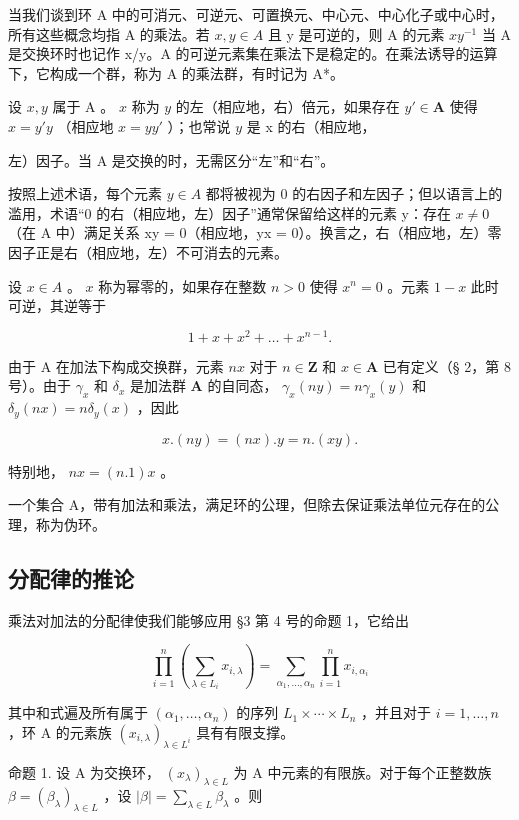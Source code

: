 当我们谈到环 A 中的可消元、可逆元、可置换元、中心元、中心化子或中心时，所有这些概念均指 A 的乘法。若 \(x, y \in A\) 且 y 是可逆的，则 A 的元素 \(xy^{-1}\) 当 A 是交换环时也记作 x/y。A 的可逆元素集在乘法下是稳定的。在乘法诱导的运算下，它构成一个群，称为 A 的乘法群，有时记为 A*。

设 \(x, y\) 属于 A 。 \(x\) 称为 \(y\) 的左（相应地，右）倍元，如果存在 \(y' \in \mathbf{A}\) 使得 \(x = y'y\) （相应地 \(x = yy'\) ）；也常说 \(y\) 是 x 的右（相应地，

左）因子。当 A 是交换的时，无需区分“左”和“右”。

按照上述术语，每个元素 \(y \in A\) 都将被视为 0 的右因子和左因子；但以语言上的滥用，术语“0 的右（相应地，左）因子”通常保留给这样的元素 y：存在 \(x \neq 0\) （在 A 中）满足关系 xy = 0（相应地，yx = 0）。换言之，右（相应地，左）零因子正是右（相应地，左）不可消去的元素。

设 \(x \in A\) 。 \(x\) 称为幂零的，如果存在整数 \(n > 0\) 使得 \(x^n = 0\) 。元素 \(1 - x\) 此时可逆，其逆等于

\[
1 + x + x ^ {2} + \dots + x ^ {n - 1}.
\]

由于 A 在加法下构成交换群，元素 \(nx\) 对于 \(n \in \mathbf{Z}\) 和 \(x \in \mathbf{A}\) 已有定义（§ 2，第 8 号）。由于 \(\gamma_x\) 和 \(\delta_x\) 是加法群 \(\mathbf{A}\) 的自同态， \(\gamma_x(ny) = n\gamma_x(y)\) 和 \(\delta_y(nx) = n\delta_y(x)\) ，因此

\[
x. (n y) = (n x). y = n. (x y).
\]

特别地， \(nx = (n.1)x\) 。

一个集合 A，带有加法和乘法，满足环的公理，但除去保证乘法单位元存在的公理，称为伪环。

\subsection{分配律的推论}

乘法对加法的分配律使我们能够应用 §3 第 4 号的命题 1，它给出

\[
\prod_ {i = 1} ^ {n} \left(\sum_ {\lambda \in L _ {i}} x _ {i, \lambda}\right) = \sum_ {\alpha_ {1}, \dots , \alpha_ {n}} \prod_ {i = 1} ^ {n} x _ {i, \alpha_ {i}}\tag{13}
\]

其中和式遍及所有属于 \((\alpha_{1},\ldots,\alpha_{n})\) 的序列 \(L_{1}\times\cdots\times L_{n}\) ，并且对于 \(i=1,\ldots,n\) ，环 A 的元素族 \((x_{i,\lambda})_{\lambda\in L^{i}}\) 具有有限支撑。

命题 1. 设 A 为交换环， \((x_{\lambda})_{\lambda \in L}\) 为 A 中元素的有限族。对于每个正整数族 \(\beta = (\beta_{\lambda})_{\lambda \in L}\) ，设 \(|\beta| = \sum_{\lambda \in L} \beta_{\lambda}\) 。则

